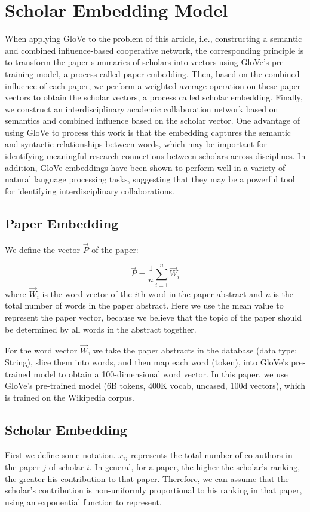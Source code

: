 \documentclass[conference]{IEEEtran}
\begin{document}
\section{Scholar Embedding Model}
When applying GloVe to the problem of this article, i.e., constructing a
semantic and combined influence-based cooperative network, the
corresponding principle is to transform the paper summaries of
scholars into vectors using GloVe's pre-training model, a process called
paper embedding. Then, based on the combined influence of each
paper, we perform a weighted average operation on these paper
vectors to obtain the scholar vectors, a process called scholar
embedding. Finally, we construct an interdisciplinary academic
collaboration network based on semantics and combined influence based on
the scholar vector. One advantage of using GloVe to process this work is
that the embedding captures the semantic and syntactic relationships
between words, which may be important for identifying meaningful
research connections between scholars across disciplines. In addition,
GloVe embeddings have been shown to perform well in a variety of natural
language processing tasks, suggesting that they may be a powerful tool
for identifying interdisciplinary collaborations.

\subsection{Paper Embedding}
We define the vector \(\vec P\) of the paper:

\begin{equation}\label{eq:P}
    \vec P = \frac{1}{n}\sum_{i=1}^{n} \vec W_i
\end{equation}
where \(\vec W_i\) is the word vector of the \(i\)th word in the
paper abstract and \(n\) is the total number of words in the
paper abstract. Here we use the mean value to represent the
paper vector, because we believe that the topic of the paper
should be determined by all words in the abstract together.

For the word vector \(\vec W\), we take the paper abstracts in the
database (data type: String), slice them into words, and then map each
word (token), into GloVe's pre-trained model to obtain a
100-dimensional word vector. In this paper, we use GloVe's
pre-trained model (6B tokens, 400K vocab, uncased, 100d vectors), which
is trained on the Wikipedia corpus.

\subsection{Scholar Embedding}
First we define some notation. \(x_{ij}\) represents the total number of
co-authors in the paper \(j\) of scholar \(i\). In general, for a
paper, the higher the scholar's ranking, the greater his
contribution to that paper. Therefore, we can assume that the
scholar's contribution is non-uniformly proportional to his ranking in
that paper, using an exponential function to represent.
\end{document}
